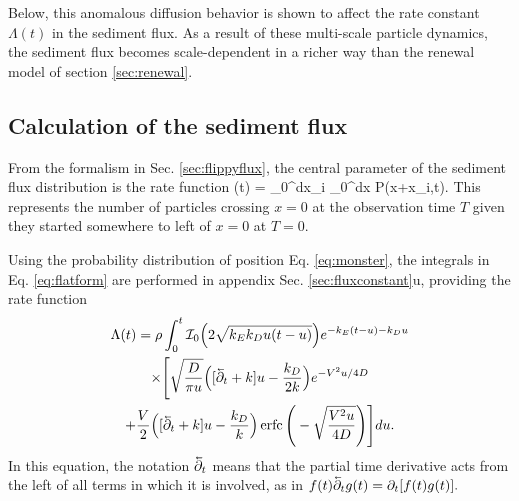 Below, this anomalous diffusion behavior \citep[cf.][]{Sokolov2012} is shown to affect the rate constant $\Lambda(t)$ in the sediment flux. As a result of these multi-scale particle dynamics, the sediment flux becomes scale-dependent in a richer way than the renewal model of section \ref{sec:renewal}.

\subsection{Calculation of the sediment flux}

From the formalism in Sec. \ref{sec:flippyflux}, the central parameter of the sediment flux distribution is the rate function
\be \Lambda(t) = \rho \int_0^\infty dx_i \int_0^\infty dx P(x+x_i,t). \label{eq:flatform}\ee
This represents the number of particles crossing $x=0$ at the observation time $T$ given they started somewhere to left of $x=0$ at $T=0$.

Using the probability distribution of position Eq. \ref{eq:monster}, the integrals in Eq. \ref{eq:flatform} are performed in appendix Sec. \ref{sec:fluxconstant}u, providing the rate function
\begin{multline} 
\Lambda(t) = \rho \int_0^t \mathcal{I}_0\Big(2\sqrt{k_Ek_Du(t-u)}\Big)e^{-k_E(t-u)-k_D u} \\
\times \Bigg[\sqrt{\frac{D}{\pi u}}\Big([\cev{\partial_t} + k]u-\frac{k_D}{2 k}\Big)e^{-V^2 u/4D} \\+ \frac{V}{2}\Big([\cev{\partial_t} + k]u -\frac{k_D}{k}\Big) \erfc\Bigg(-\sqrt{\frac{V^2 u}{4D}}\Bigg)\Bigg] du. \label{eq:fluxy}
\end{multline}
In this equation, the notation $\cev{\partial_t}$ means that the partial time derivative acts from the left of all terms in which it is involved, as in $f(t)\cev{\partial_t} g(t) = \partial_t [f(t)g(t)].$

